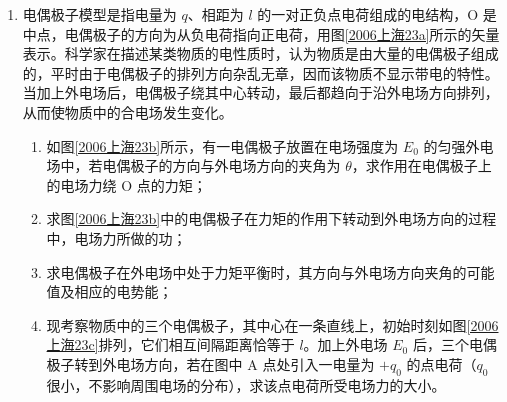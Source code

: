 \documentclass[\gkver]{gaokaozhenti}
\begin{document}
\begin{enumerate}
{（2）线框从离开磁场至上升到最高点的过程，由动能定理得

$(mg+f)h=\frac{1}{2}mv_{1}^{2}$ ③

线框从最高点回落至磁场的过程

$(mg-f)h=\frac{1}{2}mv_{2}^{2}$ ④

③、④式联立解得

$v_{1}=\sqrt{\frac{mg+f}{mg-f}}v_{2}$ ⑤

$=\frac{R\sqrt{(mg)^{2}-f^{2}}}{B^{2}a^{2}}$ ⑥

（3）线框在向上通过磁场过程中，由动能定理得

$\frac{1}{2}mv_{0}^{2}-\frac{1}{2}mv_{1}^{2}=Q+(mg+f)(a+b)$ ⑦

又 $v_{0}=2v_{1}$，联立解得

$Q=\frac{3}{2}m[(mg)^{2}-f^{2}]\frac{R^{2}}{B^{4}a^{4}}-(mg+f)(a+b)$ ⑧
}

\item
电偶极子模型是指电量为 $q$、相距为 $l$ 的一对正负点电荷组成的电结构，O 是中点，电偶极子的方向为从负电荷指向正电荷，用图\ref{2006上海23a}所示的矢量表示。科学家在描述某类物质的电性质时，认为物质是由大量的电偶极子组成的，平时由于电偶极子的排列方向杂乱无章，因而该物质不显示带电的特性。当加上外电场后，电偶极子绕其中心转动，最后都趋向于沿外电场方向排列，从而使物质中的合电场发生变化。

\begin{enumerate}
	\item
	如图\ref{2006上海23b}所示，有一电偶极子放置在电场强度为 $E_{0}$ 的匀强外电场中，若电偶极子的方向与外电场方向的夹角为 $\theta$，求作用在电偶极子上的电场力绕 O 点的力矩；
	\item
	求图\ref{2006上海23b}中的电偶极子在力矩的作用下转动到外电场方向的过程中，电场力所做的功；
	\item
	求电偶极子在外电场中处于力矩平衡时，其方向与外电场方向夹角的可能值及相应的电势能；
	\item
	现考察物质中的三个电偶极子，其中心在一条直线上，初始时刻如图\ref{2006上海23c}排列，它们相互间隔距离恰等于 $l$。加上外电场 $E_{0}$ 后，三个电偶极子转到外电场方向，若在图中 A 点处引入一电量为 $+q_{0}$ 的点电荷（$q_{0}$ 很小，不影响周围电场的分布），求该点电荷所受电场力的大小。
\end{enumerate}



\end{enumerate}
\end{document}
